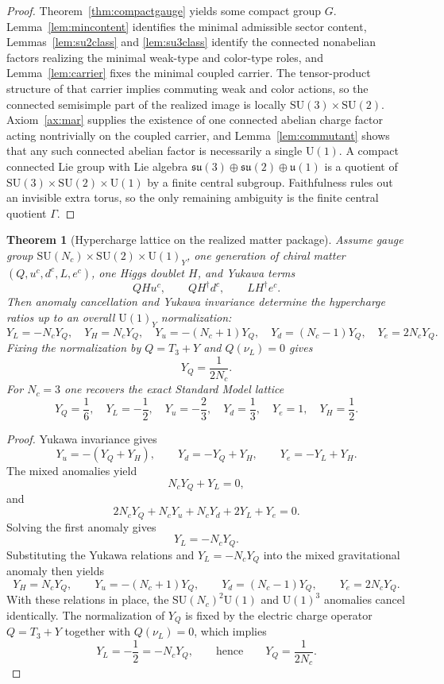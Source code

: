 \documentclass[11pt]{article}
\newtheorem{theorem}{Theorem}[section]
\newcommand{\SU}{\mathrm{SU}}
\newcommand{\U}{\mathrm{U}}
\begin{document}
\begin{proof}
Theorem~\ref{thm:compactgauge} yields some compact group $G$. Lemma~\ref{lem:mincontent} identifies the minimal admissible sector content, Lemmas~\ref{lem:su2class} and \ref{lem:su3class} identify the connected nonabelian factors realizing the minimal weak-type and color-type roles, and Lemma~\ref{lem:carrier} fixes the minimal coupled carrier. The tensor-product structure of that carrier implies commuting weak and color actions, so the connected semisimple part of the realized image is locally $\SU(3)\times\SU(2)$. Axiom~\ref{ax:mar} supplies the existence of one connected abelian charge factor acting nontrivially on the coupled carrier, and Lemma~\ref{lem:commutant} shows that any such connected abelian factor is necessarily a single $\U(1)$. A compact connected Lie group with Lie algebra $\mathfrak{su}(3)\oplus\mathfrak{su}(2)\oplus\mathfrak{u}(1)$ is a quotient of $\SU(3)\times\SU(2)\times\U(1)$ by a finite central subgroup. Faithfulness rules out an invisible extra torus, so the only remaining ambiguity is the finite central quotient $\Gamma$.
\end{proof}

\begin{theorem}[Hypercharge lattice on the realized matter package]\label{thm:hypercharge}
Assume gauge group $\SU(N_c)\times\SU(2)\times\U(1)_Y$, one generation of chiral matter $(Q,u^c,d^c,L,e^c)$, one Higgs doublet $H$, and Yukawa terms
\[
QHu^c,\qquad QH^\dagger d^c,\qquad LH^\dagger e^c.
\]
Then anomaly cancellation and Yukawa invariance determine the hypercharge ratios up to an overall \(\U(1)_Y\) normalization:
\[
Y_L=-N_cY_Q,\quad
Y_H=N_cY_Q,\quad
Y_u=-(N_c+1)Y_Q,\quad
Y_d=(N_c-1)Y_Q,\quad
Y_e=2N_cY_Q.
\]
Fixing the normalization by $Q=T_3+Y$ and $Q(\nu_L)=0$ gives
\[
Y_Q=\frac{1}{2N_c}.
\]
For $N_c=3$ one recovers the exact Standard Model lattice
\[
Y_Q=\frac16,\quad
Y_L=-\frac12,\quad
Y_u=-\frac23,\quad
Y_d=\frac13,\quad
Y_e=1,\quad
Y_H=\frac12.
\]
\end{theorem}

\begin{proof}
Yukawa invariance gives
\[
Y_u=-(Y_Q+Y_H),\qquad
Y_d=-Y_Q+Y_H,\qquad
Y_e=-Y_L+Y_H.
\]
The mixed anomalies yield
\[
N_cY_Q+Y_L=0,
\]
and
\[
2N_cY_Q+N_cY_u+N_cY_d+2Y_L+Y_e=0.
\]
Solving the first anomaly gives
\[
Y_L=-N_cY_Q.
\]
Substituting the Yukawa relations and $Y_L=-N_cY_Q$ into the mixed gravitational anomaly then yields
\[
Y_H=N_cY_Q,\qquad
Y_u=-(N_c+1)Y_Q,\qquad
Y_d=(N_c-1)Y_Q,\qquad
Y_e=2N_cY_Q.
\]
With these relations in place, the $\SU(N_c)^2\U(1)$ and $\U(1)^3$ anomalies cancel identically. The normalization of $Y_Q$ is fixed by the electric charge operator $Q=T_3+Y$ together with $Q(\nu_L)=0$, which implies
\[
Y_L=-\frac12=-N_cY_Q,
\qquad\text{hence}\qquad
Y_Q=\frac{1}{2N_c}.
\]
\end{proof}
\end{document}
